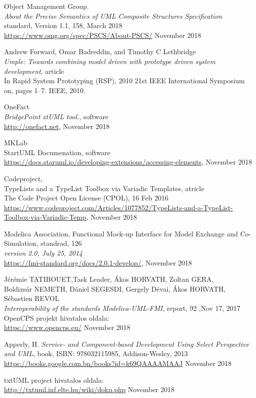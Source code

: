 \documentclass[a4paper,12pt]{report}
\begin{document}
\begin{thebibliography}{4}
	Object Management Group. \\
	\emph{About the Precise Semantics of UML Composite Structures Specification}
	standard, Version 1.1, 158, March 2018\\
	\url{https://www.omg.org/spec/PSCS/About-PSCS/} November 2018
	
	Andrew Forward, Omar Badreddin, and Timothy C Lethbridge \\
	\emph{Umple: Towards combining model driven with prototype driven system development}, article \\
	In Rapid System Prototyping (RSP), 2010 21st IEEE International Symposium on, pages 1–7. IEEE, 2010.

	OneFact \\
	\emph{BridgePoint xtUML tool.}, software \\
	\url{http://onefact.net}, November 2018
	
	MKLab \\
	StartUML Documenation, software \\
	\url{https://docs.staruml.io/developing-extensions/accessing-elements}, November 2018
	
	Codeproject, \\
	TypeLists and a TypeList Toolbox via Variadic Templates, atricle \\
	The Code Project Open License (CPOL), 16 Feb 2016
	\url{https://www.codeproject.com/Articles/1077852/TypeLists-and-a-TypeList-Toolbox-via-Variadic-Temp},
	November 2018
	
	Modelica Association, 
	Functional Mock-up Interface for Model Exchange and Co-Simulation, 
	standrad, 126 \\
	\emph{version 2.0, July 25, 2014}  \\
	\url{https://fmi-standard.org/docs/2.0.1-develop/}, November 2018
	
	Jérémie TATIBOUET,Task Leader, Ákos HORVATH, Zoltan GERA, \\
	Boldizsár NEMETH, Dániel SEGESDI, Gergely Dévai, Ákos HORVATH, Sébastien REVOL \\
	\emph{Interoperability of the standards Modelica-UML-FMI}, report, 92 ,Nov 17, 2017 \\
	
	OpenCPS projekt hivatalos oldala: \\
	\url{https://www.opencps.eu/} November 2018
	
  Apperly, H.
  \emph{Service- and Component-based Development Using Select Perspective and UML}, book, 
  ISBN: 978032115985, Addison-Wesley, 2013 \\
  \url{https://books.google.com.bn/books?id=k69QAAAAMAAJ} November 2018
  
	txtUML project hivatalos oldala: \\
	\url{http://txtuml.inf.elte.hu/wiki/doku.php} November 2018
	

	
\end{thebibliography}
\end{document}
